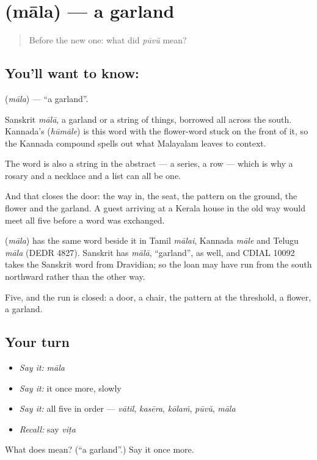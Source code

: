 \section[\texorpdfstring{\ml{മാല} (māla)}{മാല (māla)}]{ (māla) — a garland}

\label{lesson:ML-C52-garland}



\begin{quote}
Before the new one: what did \emph{pūvŭ} mean?
\end{quote}

\subsection*{You'll want to know: }
\textbf{} (\emph{māla}) — \textquotedblleft{}a garland\textquotedblright{}.

Sanskrit \emph{mālā}, a garland or a string of things, borrowed all across the south. Kannada's  (\emph{hūmāle}) is this word with the flower-word stuck on the front of it, so the Kannada compound spells out what Malayalam leaves to context.

The word is also a string in the abstract — a series, a row — which is why a rosary and a necklace and a list can all be one.

And that closes the door: the way in, the seat, the pattern on the ground, the flower and the garland. A guest arriving at a Kerala house in the old way would meet all five before a word was exchanged.

\begin{cousinweb}
\textbf{} (\emph{māla}) has the same word beside it in Tamil \emph{mālai}, Kannada \emph{māle} and Telugu \emph{māla} (DEDR 4827). Sanskrit has \emph{mālā}, \textquotedblleft{}garland\textquotedblright{}, as well, and CDIAL 10092 takes the Sanskrit word from Dravidian; so the loan may have run from the south northward rather than the other way.
\end{cousinweb}

\begin{grammarlens}[title={What you've built}]
Five, and the run is closed: a door, a chair, the pattern at the threshold, a flower, a garland.
\end{grammarlens}

\subsection*{Your turn}
\begin{itemize}
\raggedright
  \item \emph{Say it:} \emph{māla}
  \item \emph{Say it:} it once more, slowly
  \item \emph{Say it:} all five in order — \emph{vātil}, \emph{kasēra}, \emph{kōlaṁ}, \emph{pūvŭ}, \emph{māla}
  \item \emph{Recall:} say \emph{viṭa}
\end{itemize}

\begin{tcolorbox}[breakable,colback=teal!4,colframe=teal!35!black,title={Before you move on}]
What does  mean? (\textquotedblleft{}a garland\textquotedblright{}.) Say it once more.
\end{tcolorbox}
